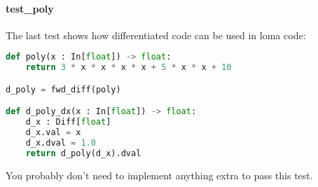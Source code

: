 \paragraph{test_poly} The last test shows how differentiated code can be used in loma code:
\begin{lstlisting}[language=Python]
def poly(x : In[float]) -> float:
    return 3 * x * x * x * x + 5 * x * x + 10

d_poly = fwd_diff(poly)

def d_poly_dx(x : In[float]) -> float:
    d_x : Diff[float]
    d_x.val = x
    d_x.dval = 1.0
    return d_poly(d_x).dval
\end{lstlisting}
You probably don't need to implement anything extra to pass this test.


